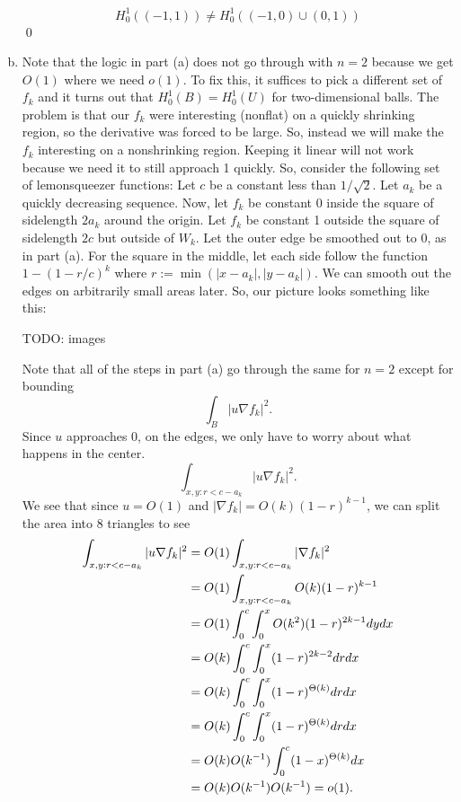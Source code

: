 \documentclass{article}
\newcommand{\D}{\nabla}
\begin{document}
\begin{enumerate}[(a)]
    \[ H_0^1((-1,1)) \ne H_0^1((-1,0) \cup (0,1))\]
    \qed
    \item Note that the logic in part (a) does not go through with $n=2$ because we get $O(1)$ where we need $o(1)$. To fix this, it suffices to pick a different set of $f_k$ and it turns out that $H_0^1(B) = H_0^1(U)$ for two-dimensional balls. The problem is that our $f_k$ were interesting (nonflat) on a quickly shrinking region, so the derivative was forced to be large. 
    \hop
    So, instead we will make the $f_k$ interesting on a nonshrinking region. Keeping it linear will not work because we need it to still approach 1 quickly. So, consider the following set of lemonsqueezer functions:
    \hop 
    Let $c$ be a constant less than $1/\sqrt{2}$. Let $a_k$ be a quickly decreasing sequence. Now, let $f_k$ be constant 0 inside the square of sidelength $2a_k$ around the origin. Let $f_k$ be constant 1 outside the square of sidelength $2c$ but outside of $W_k$. Let the outer edge be smoothed out to 0, as in part (a). For the square in the middle, let each side follow the function $1 - (1-r/c)^{k}$ where $r := \min(|x-a_k|, |y-a_k|)$. We can smooth out the edges on arbitrarily small areas later. So, our picture looks something like this: 

    TODO: images

    Note that all of the steps in part (a) go through the same for $n=2$ except for bounding 
    \[\int_B|u \D f_k|^2.\]
    Since $u$ approaches 0, on the edges, we only have to worry about what happens in the center. 
    \[\int_{x,y: r < c-a_k}|u \D f_k|^2.\]
    We see that since $u = O(1)$ and $|\D f_k| = O(k)(1-r)^{k-1}$, we can split the area into 8 triangles to see
    \begin{align*}
        \int_{x,y : r < c-a_k}|u \D f_k|^2 &= O(1) \int_{x,y : r < c-a_k}|\D f_k|^2 \\
        &=  O(1)\int_{x,y : r < c-a_k} O(k)(1-r)^{k-1} \\
        &= O(1)\int_0^c\int_0^x O(k^2)(1-r)^{2k-1} dydx \\
        &= O(k)\int_0^c\int_0^x (1-r)^{2k-2} drdx \\
        &= O(k)\int_0^c\int_0^x (1-r)^{\Theta(k)} drdx \\
        &= O(k)\int_0^c\int_0^x (1-r)^{\Theta(k)} drdx \\
        &= O(k)O(k\inv)\int_0^c (1-x)^{\Theta(k)} dx \\
        &= O(k)O(k\inv)O(k\inv) = o(1).
    \end{align*}

\end{enumerate}
\end{document}
